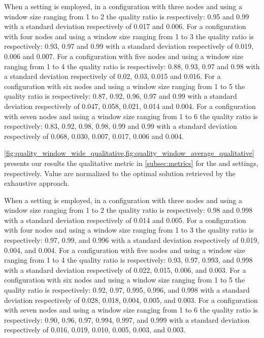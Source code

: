 When a \average setting is employed, in a configuration with three nodes and using a window size ranging from 1 to 2 the quality ratio is respectively: 0.95 and 0.99 with a standard deviation respectively of 0.017 and 0.006. For a configuration with four nodes and using a window size ranging from 1 to 3 the quality ratio is respectively: 0.93, 0.97 and 0.99 with a standard deviation respectively of 0.019, 0.006 and 0.007. For a configuration with five nodes and using a window size ranging from 1 to 4 the quality ratio is respectively:
0.88, 0.93, 0.97 and 0.98 with a standard deviation respectively of 0.02, 0.03, 0.015 and 0.016. For a configuration with six nodes and using a window size ranging from 1 to 5 the quality ratio is respectively:
0.87, 0.92, 0.96, 0.97 and 0.99 with a standard deviation respectively of 0.047, 0.058, 0.021, 0.014 and 0.004. For a configuration with seven nodes and using a window size ranging from 1 to 6 the quality ratio is respectively:
0.83, 0.92, 0.98, 0.98, 0.99 and 0.99 with a standard deviation respectively of 0.068, 0.030, 0.007, 0.017, 0.006 and 0.004.


\cref{fig:quality_window_wide_qualitative,fig:quality_window_average_qualitative} presents our results the qualitative metric in \cref{subsec:metrics} for the \wide and \average settings, respectively.
Value are normalized to the optimal solution retrieved by the exhaustive approach.

When a \wide setting is employed, in a configuration with three nodes and using a window size ranging from 1 to 2 the quality ratio is respectively: 0.98 and 0.998 with a standard deviation respectively of 0.014 and 0.005. For a configuration with four nodes and using a window size ranging from 1 to 3 the quality ratio is respectively: 0.97, 0.99, and 0.996 with a standard deviation respectively of 0.019, 0.004, and 0.004. For a configuration with five nodes and using a window size ranging from 1 to 4 the quality ratio is respectively:
0.93, 0.97, 0.993, and 0.998 with a standard deviation respectively of 0.022, 0.015, 0.006, and 0.003. For a configuration with six nodes and using a window size ranging from 1 to 5 the quality ratio is respectively:
0.92, 0.97, 0.995, 0.996, and 0.998 with a standard deviation respectively of 0.028, 0.018, 0.004, 0.005, and 0.003. For a configuration with seven nodes and using a window size ranging from 1 to 6 the quality ratio is respectively:
0.90, 0.96, 0.97, 0.994, 0.997, and 0.999 with a standard deviation respectively of 0.016, 0.019, 0.010, 0.005, 0.003, and 0.003.


